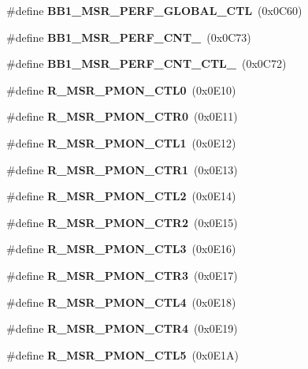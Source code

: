 \begin{DoxyCompactItemize}
\#define {\bfseries B\+B1\+\_\+\+M\+S\+R\+\_\+\+P\+E\+R\+F\+\_\+\+G\+L\+O\+B\+A\+L\+\_\+\+C\+TL}~(0x0\+C60)
\item 
\mbox{\label{types_8h_a33e4ec281632da2dc617bc5d5178acc4}} 
\#define {\bfseries B\+B1\+\_\+\+M\+S\+R\+\_\+\+P\+E\+R\+F\+\_\+\+C\+N\+T\+\_}~(0x0\+C73)
\item 
\mbox{\label{types_8h_acd0d76fc99515638469c45af914911fd}} 
\#define {\bfseries B\+B1\+\_\+\+M\+S\+R\+\_\+\+P\+E\+R\+F\+\_\+\+C\+N\+T\+\_\+\+C\+T\+L\+\_}~(0x0\+C72)
\item 
\mbox{\label{types_8h_af59d8541df8e5d53dc246d82d2a1d308}} 
\#define {\bfseries R\+\_\+\+M\+S\+R\+\_\+\+P\+M\+O\+N\+\_\+\+C\+T\+L0}~(0x0\+E10)
\item 
\mbox{\label{types_8h_aca5c935e94f63573a1952360d27cd292}} 
\#define {\bfseries R\+\_\+\+M\+S\+R\+\_\+\+P\+M\+O\+N\+\_\+\+C\+T\+R0}~(0x0\+E11)
\item 
\mbox{\label{types_8h_adc34ee61f18fe9ea31afab3bc2a051ff}} 
\#define {\bfseries R\+\_\+\+M\+S\+R\+\_\+\+P\+M\+O\+N\+\_\+\+C\+T\+L1}~(0x0\+E12)
\item 
\mbox{\label{types_8h_a582c8c015836e8dc390d7f2aca275275}} 
\#define {\bfseries R\+\_\+\+M\+S\+R\+\_\+\+P\+M\+O\+N\+\_\+\+C\+T\+R1}~(0x0\+E13)
\item 
\mbox{\label{types_8h_acf75418036ae39a09749cf220e8852ac}} 
\#define {\bfseries R\+\_\+\+M\+S\+R\+\_\+\+P\+M\+O\+N\+\_\+\+C\+T\+L2}~(0x0\+E14)
\item 
\mbox{\label{types_8h_a2565d3aa63c53f8c762a8bbca6ae5557}} 
\#define {\bfseries R\+\_\+\+M\+S\+R\+\_\+\+P\+M\+O\+N\+\_\+\+C\+T\+R2}~(0x0\+E15)
\item 
\mbox{\label{types_8h_a03516d9b5b9b1a01487b66183cd05e4f}} 
\#define {\bfseries R\+\_\+\+M\+S\+R\+\_\+\+P\+M\+O\+N\+\_\+\+C\+T\+L3}~(0x0\+E16)
\item 
\mbox{\label{types_8h_ad0eae26f39eb1bce7640d6fcbeffdd78}} 
\#define {\bfseries R\+\_\+\+M\+S\+R\+\_\+\+P\+M\+O\+N\+\_\+\+C\+T\+R3}~(0x0\+E17)
\item 
\mbox{\label{types_8h_ad12afe1f2cbdde949fc5e627458eb8ad}} 
\#define {\bfseries R\+\_\+\+M\+S\+R\+\_\+\+P\+M\+O\+N\+\_\+\+C\+T\+L4}~(0x0\+E18)
\item 
\mbox{\label{types_8h_ab3524046d5822fed0e47828d20acc3e9}} 
\#define {\bfseries R\+\_\+\+M\+S\+R\+\_\+\+P\+M\+O\+N\+\_\+\+C\+T\+R4}~(0x0\+E19)
\item 
\mbox{\label{types_8h_a394018738b4fdd7e6a794db59bd74fab}} 
\#define {\bfseries R\+\_\+\+M\+S\+R\+\_\+\+P\+M\+O\+N\+\_\+\+C\+T\+L5}~(0x0\+E1\+A)

\end{DoxyCompactItemize}
